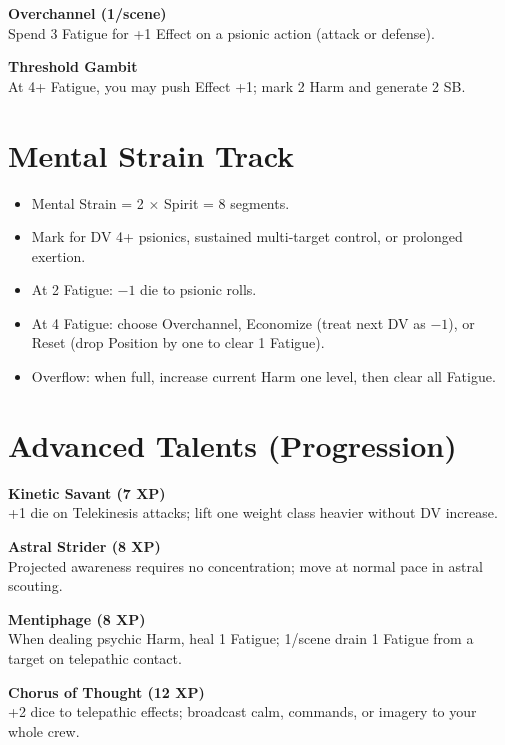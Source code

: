 \documentclass[11pt]{article}
\newenvironment{talentbox}[1]{%
  \begin{mdframed}[backgroundcolor=gray!10, linewidth=1pt, linecolor=gray!50]
  \textbf{#1}\\
}{\end{mdframed}}
\begin{document}
\begin{talentbox}{Overchannel (1/scene)}
    Spend 3 Fatigue for +1 Effect on a psionic action (attack or defense).
\end{talentbox}

\begin{talentbox}{Threshold Gambit}
    At 4+ Fatigue, you may push Effect +1; mark 2 Harm and generate 2 SB.
\end{talentbox}

\section*{Mental Strain Track}
\begin{itemize}[leftmargin=*]
    \item Mental Strain = 2 $\times$ Spirit = 8 segments.
    \item Mark for DV 4+ psionics, sustained multi-target control, or prolonged exertion.
    \item At 2 Fatigue: $-1$ die to psionic rolls.
    \item At 4 Fatigue: choose Overchannel, Economize (treat next DV as $-1$), or Reset (drop Position by one to clear 1 Fatigue).
    \item Overflow: when full, increase current Harm one level, then clear all Fatigue.
\end{itemize}

\section*{Advanced Talents (Progression)}

\begin{talentbox}{Kinetic Savant (7 XP)}
    +1 die on Telekinesis attacks; lift one weight class heavier without DV increase.
\end{talentbox}

\begin{talentbox}{Astral Strider (8 XP)}
    Projected awareness requires no concentration; move at normal pace in astral scouting.
\end{talentbox}

\begin{talentbox}{Mentiphage (8 XP)}
    When dealing psychic Harm, heal 1 Fatigue; 1/scene drain 1 Fatigue from a target on telepathic contact.
\end{talentbox}

\begin{talentbox}{Chorus of Thought (12 XP)}
    +2 dice to telepathic effects; broadcast calm, commands, or imagery to your whole crew.
\end{talentbox}
\end{document}
